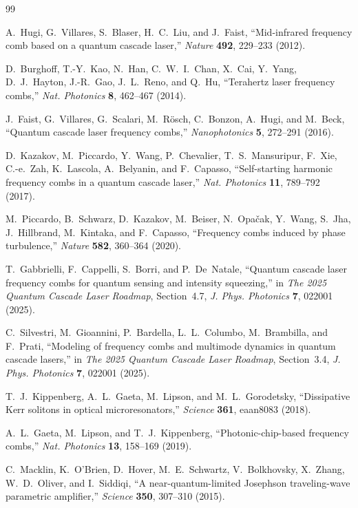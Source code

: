 \documentclass[11pt,letterpaper]{article}
\theoremstyle{definition}
\theoremstyle{remark}
\begin{document}
\begin{thebibliography}{99}

A.~Hugi, G.~Villares, S.~Blaser, H.~C.~Liu, and J.~Faist, ``Mid-infrared frequency comb based on a quantum cascade laser,'' \textit{Nature} \textbf{492}, 229--233 (2012).

D.~Burghoff, T.-Y.~Kao, N.~Han, C.~W.~I.~Chan, X.~Cai, Y.~Yang, D.~J.~Hayton, J.-R.~Gao, J.~L.~Reno, and Q.~Hu, ``Terahertz laser frequency combs,'' \textit{Nat. Photonics} \textbf{8}, 462--467 (2014).

J.~Faist, G.~Villares, G.~Scalari, M.~R\"osch, C.~Bonzon, A.~Hugi, and M.~Beck, ``Quantum cascade laser frequency combs,'' \textit{Nanophotonics} \textbf{5}, 272--291 (2016).

D.~Kazakov, M.~Piccardo, Y.~Wang, P.~Chevalier, T.~S.~Mansuripur, F.~Xie, C.-e.~Zah, K.~Lascola, A.~Belyanin, and F.~Capasso, ``Self-starting harmonic frequency combs in a quantum cascade laser,'' \textit{Nat. Photonics} \textbf{11}, 789--792 (2017).

M.~Piccardo, B.~Schwarz, D.~Kazakov, M.~Beiser, N.~Opa\v{c}ak, Y.~Wang, S.~Jha, J.~Hillbrand, M.~Kintaka, and F.~Capasso, ``Frequency combs induced by phase turbulence,'' \textit{Nature} \textbf{582}, 360--364 (2020).

T.~Gabbrielli, F.~Cappelli, S.~Borri, and P.~De~Natale, ``Quantum cascade laser frequency combs for quantum sensing and intensity squeezing,'' in \textit{The 2025 Quantum Cascade Laser Roadmap}, Section~4.7, \textit{J. Phys. Photonics} \textbf{7}, 022001 (2025).

C.~Silvestri, M.~Gioannini, P.~Bardella, L.~L.~Columbo, M.~Brambilla, and F.~Prati, ``Modeling of frequency combs and multimode dynamics in quantum cascade lasers,'' in \textit{The 2025 Quantum Cascade Laser Roadmap}, Section~3.4, \textit{J. Phys. Photonics} \textbf{7}, 022001 (2025).

T.~J.~Kippenberg, A.~L.~Gaeta, M.~Lipson, and M.~L.~Gorodetsky, ``Dissipative Kerr solitons in optical microresonators,'' \textit{Science} \textbf{361}, eaan8083 (2018).

A.~L.~Gaeta, M.~Lipson, and T.~J.~Kippenberg, ``Photonic-chip-based frequency combs,'' \textit{Nat. Photonics} \textbf{13}, 158--169 (2019).

C.~Macklin, K.~O'Brien, D.~Hover, M.~E.~Schwartz, V.~Bolkhovsky, X.~Zhang, W.~D.~Oliver, and I.~Siddiqi, ``A near-quantum-limited Josephson traveling-wave parametric amplifier,'' \textit{Science} \textbf{350}, 307--310 (2015).


\end{thebibliography}
\end{document}
